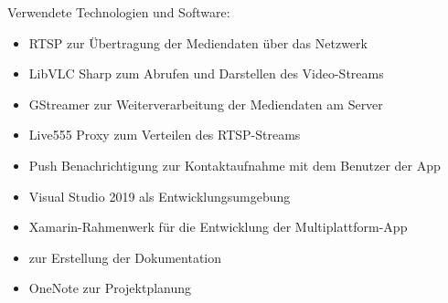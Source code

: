Verwendete Technologien und Software:
\begin{itemize}
    \item RTSP zur Übertragung der Mediendaten über das Netzwerk
    \item LibVLC Sharp zum Abrufen und Darstellen des Video-Streams
    \item GStreamer zur Weiterverarbeitung der Mediendaten am Server
    \item Live555 Proxy zum Verteilen des RTSP-Streams
    \item Push Benachrichtigung zur Kontaktaufnahme mit dem Benutzer der App
    \item Visual Studio 2019 als Entwicklungsumgebung
    \item Xamarin-Rahmenwerk für die Entwicklung der Multiplattform-App
    \item {} zur Erstellung der Dokumentation
    \item OneNote zur Projektplanung
\end{itemize}